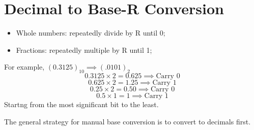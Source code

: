\documentclass[12pt]{article} %
\begin{document}
\section*{Decimal to Base-R Conversion}
\begin{itemize}
    \item Whole numbers: repeatedly divide by R until 0;
    \item Fractions: repeatedly multiple by R until 1;
\end{itemize}
For example, \((0.3125)_{10} \implies (.0101)_2\)
\[0.3125 \times 2 = 0.625   \implies \text{Carry 0}\]
\[0.625 \times 2 = 1.25     \implies \text{Carry 1}\]
\[0.25 \times 2 = 0.50      \implies \text{Carry 0}\]
\[0.5 \times 1 = 1          \implies \text{Carry 1}\]
Startng from the most significant bit to the least.

The general strategy for manual base conversion is to convert to decimals first.
\end{document}
